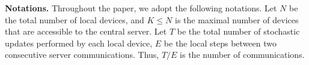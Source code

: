 

\textbf{Notations.}
Throughout the paper, we adopt the following notations. Let $N$ be the total
number of local devices, and $K \leq N$ is the maximal number of devices
that are accessible to the central server.  Let $T$ be the total number of stochastic updates performed by each local device, $E$ be the local steps between two consecutive server communications. Thus, $T/E$ is
the number of communications.








